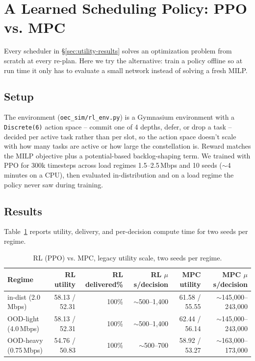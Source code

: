 \section{A Learned Scheduling Policy: PPO vs. MPC}
\label{sec:rl}

Every scheduler in \S\ref{sec:utility-results} solves an optimization problem from scratch at every re-plan. Here we try the alternative: train a policy offline so at run time it only has to evaluate a small network instead of solving a fresh MILP.


\subsection{Setup}

The environment (\texttt{oec\_sim/rl\_env.py}) is a Gymnasium environment with a \texttt{Discrete(6)} action space -- commit one of 4 depths, defer, or drop a task -- decided per active task rather than per slot, so the action space doesn't scale with how many tasks are active or how large the constellation is. Reward matches the MILP objective plus a potential-based backlog-shaping term. We trained with PPO for 300k timesteps across load regimes 1.5--2.5\,Mbps and 10 seeds ($\sim$4 minutes on a CPU), then evaluated in-distribution and on a load regime the policy never saw during training.

\subsection{Results}

Table~\ref{tab:rl-vs-mpc} reports utility, delivery, and per-decision compute time for two seeds per regime.

\begin{table}[h]
\centering
\caption{RL (PPO) vs. MPC, legacy utility scale, two seeds per regime.}
\label{tab:rl-vs-mpc}
\begin{tabular}{lrrrrr}
\toprule
Regime & RL utility & RL delivered\% & RL $\mu$s/decision & MPC utility & MPC $\mu$s/decision \\
\midrule
in-dist (2.0\,Mbps)   & 58.13 / 52.31 & 100\% & $\sim$500--1{,}400 & 61.58 / 55.55 & $\sim$145{,}000--243{,}000 \\
OOD-light (4.0\,Mbps) & 58.13 / 52.31 & 100\% & $\sim$500--1{,}400 & 62.44 / 56.14 & $\sim$145{,}000--243{,}000 \\
OOD-heavy (0.75\,Mbps)& 54.76 / 50.83 & 100\% & $\sim$500--700     & 58.92 / 53.27 & $\sim$163{,}000--173{,}000 \\
\bottomrule
\end{tabular}
\end{table}

